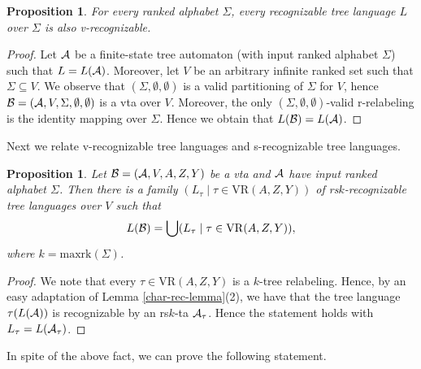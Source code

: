 \documentclass[10pt]{scrartcl}
\newtheorem{propos}[df]{Proposition}
\newcommand{\maxrk}{{\mathrm{maxrk}}}
\newcommand{\VR}{\mathrm{VR}}
\begin{document}
\begin{propos}\label{prop:rec-then-vrec} For every ranked alphabet $\Sigma$, every recognizable tree language $L$ over $\Sigma$ is also v-recognizable.
\end{propos}
\begin{proof} 
Let $\cal A$ be a finite-state tree automaton (with input ranked alphabet $\Sigma$) such that $L=L({\cal A})$. Moreover,
let $V$ be an arbitrary infinite ranked set such that $\Sigma \subseteq V$.
We observe that $(\Sigma,\emptyset,\emptyset)$ is a valid partitioning of $\Sigma$ for $V$, hence 
${\cal B} = ({\cal A},V,\Sigma,\emptyset,\emptyset)$ is a vta over $V$. Moreover, the only 
$(\Sigma,\emptyset,\emptyset)$-valid r-relabeling is the identity mapping over $\Sigma$. Hence we obtain that $L({\cal B})=L({\cal A})$.
\end{proof}

Next we relate v-recognizable tree languages  and s-recognizable tree languages. 


\begin{propos}\label{prop:vta-sta} Let ${\cal B} = ({\cal A},V,A,Z,Y)$ be a vta and ${\cal
    A}$ have input ranked alphabet $\Sigma$. Then there is a family $(L_\tau
  \mid \tau \in \VR(A,Z,Y))$ of 
rs$k$-recognizable tree languages  over $V$ such that
  $$L({\cal B}) = \bigcup (L_\tau \mid \tau \in \VR(A,Z,Y)),$$
where $k=\maxrk(\Sigma)$.
\end{propos}
\begin{proof} We note that every $\tau \in \VR(A,Z,Y)$ is a
$k$-tree relabeling. Hence, by an easy adaptation of Lemma
\ref{char-rec-lemma}(2), we have that the tree language $\tau(L({\cal A}))$ is recognizable by an
rs$k$-ta ${\cal A}_\tau$. Hence the statement holds with $L_\tau=L({\cal A}_\tau)$.
\end{proof}

In spite of the above fact, we can prove the following statement.
\end{document}
